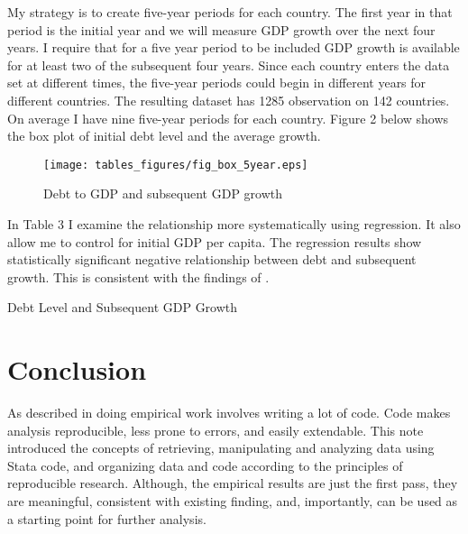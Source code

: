 \documentclass[letterpaper,11pt]{article}
\begin{document}
My strategy is to create five-year periods for each country. The first year in that period is the initial year and we will measure GDP growth over the next four years. I require that for a five year period to be included GDP growth is available for at least two of the subsequent four years. Since each country enters the data set at different times, the five-year periods could begin in different years for different countries. The resulting dataset has 1285 observation on 142 countries. On average I have nine five-year periods for each country. Figure 2 below shows the box plot of initial debt level and the average growth.

\begin{figure}[h!]
	\centering
	\texttt{[image: tables\_figures/fig\_box\_5year.eps]}
	\caption{Debt to GDP and subsequent GDP growth}
\end{figure}

In Table 3 I examine the relationship more systematically using regression. It also allow me to control for initial GDP per capita. The regression results show statistically significant negative relationship between debt and subsequent growth. This is consistent with the findings of \cite{eberhardt2015public}. 

\begin{table}[h!] \centering
\caption{Debt Level and Subsequent GDP Growth}
 
\end{table}


\section{Conclusion}

As described in  \cite{gentzkow2014code} doing empirical work involves writing a lot of code. Code makes analysis reproducible, less prone to errors, and easily extendable. This note introduced the concepts of retrieving, manipulating and analyzing data using Stata code, and organizing data and code according to the principles of reproducible research. Although, the empirical results are just the first pass, they are meaningful, consistent with existing finding, and, importantly, can be used as a starting point for further analysis. 


\end{document}
